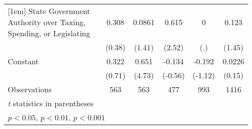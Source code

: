 {\begin{tabular*}{\linewidth}{@{\hskip\tabcolsep\extracolsep\fill}l*{5}{c}}
[1em]
State Government Authority over Taxing, Spending, or Legislating&    0.308         &   0.0861         &    0.615\sym{*}  &        0         &    0.123         \\
                &   (0.38)         &   (1.41)         &   (2.52)         &      (.)         &   (1.45)         \\
[1em]
Constant        &    0.322         &    0.651\sym{***}&   -0.134         &   -0.192         &   0.0226         \\
                &   (0.71)         &   (4.73)         &  (-0.56)         &  (-1.12)         &   (0.15)         \\
\hline
Observations    &      563         &      563         &      477         &      993         &     1416         \\
\hline\hline
\multicolumn{6}{l}{\footnotesize \textit{t} statistics in parentheses}\\
\multicolumn{6}{l}{\footnotesize \sym{*} \(p<0.05\), \sym{**} \(p<0.01\), \sym{***} \(p<0.001\)}\\
\end{tabular*}
}
